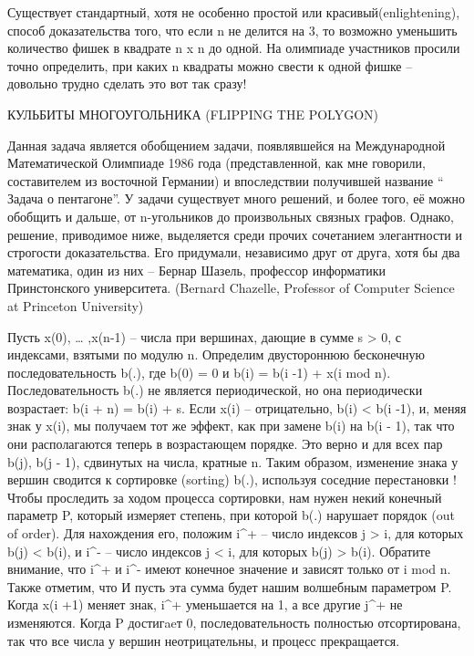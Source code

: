   Существует стандартный, хотя не особенно простой или красивый(enlightening), способ доказательства того, что если n не делится на 3, то возможно уменьшить количество фишек в квадрате n x n до одной. На олимпиаде участников просили точно определить, при каких n квадраты можно  свести к одной фишке  -- довольно трудно сделать это вот так сразу!




КУЛЬБИТЫ МНОГОУГОЛЬНИКА  (FLIPPING THE POLYGON)


   Данная задача является обобщением задачи, появлявшейся на Международной Математической Олимпиаде 1986 года (представленной, как мне говорили, составителем из восточной Германии) и впоследствии получившей название “ Задача о пентагоне”.
  У задачи существует много решений, и более того, её можно обобщить и дальше, от n-угольников до произвольных связных графов. Однако, решение, приводимое ниже, выделяется среди прочих сочетанием  элегантности и строгости доказательства. Его придумали, независимо друг от друга, хотя бы два математика, один из них -- Бернар Шазель, профессор информатики Принстонского университета. (Bernard Chazelle, Professor of Computer Science at Princeton University)


   Пусть x(0), … ,x(n-1) -- числа при вершинах, дающие в сумме s > 0, с индексами, взятыми по модулю n.  Определим двустороннюю бесконечную последовательность
b(.),  где b(0) = 0 и b(i) = b(i -1) + x(i mod n). Последовательность b(.)  не является периодической, но она периодически возрастает: b(i + n) = b(i) + s.
  Если x(i) -- отрицательно, b(i) < b(i -1), и, меняя знак у x(i), мы получаем тот же  эффект, как при замене b(i) на b(i - 1), так что они располагаются теперь в возрастающем порядке. Это верно и для всех пар b(j), b(j - 1), сдвинутых на числа, кратные n. Таким образом, изменение знака у вершин сводится к сортировке (sorting) b(.), используя соседние перестановки !
  Чтобы проследить за ходом процесса сортировки, нам нужен некий конечный параметр P, который  измеряет степень, при которой b(.) нарушает порядок (out of order). Для нахождения его, положим i^+ -- число индексов j > i, для которых b(j) < b(i), и i^- -- число индексов j < i, для которых b(j) > b(i).  Обратите внимание, что i^+ и  i^-  имеют конечное значение и зависят только от i mod n. Также отметим, что  И пусть эта сумма  будет нашим волшебным параметром P.
  Когда x(i +1) меняет знак, i^+ уменьшается на 1, а все другие j^+ не изменяются. Когда P достигaeт 0, последовательность полностью отсортирована, так что все числа у вершин неотрицательны, и процесс прекращается.


